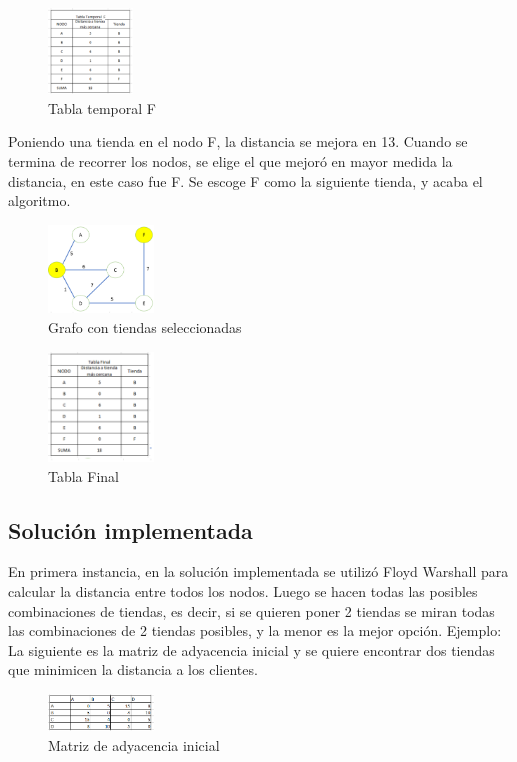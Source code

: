 \documentclass[conference,compsoc]{IEEEtran}
\begin{document}
\begin{figure}[h]
    \centering
    \includegraphics[width=0.20\textwidth]{Problema1/p14.png}
    \caption{Tabla temporal F}
    \label{fig:mesh1}
\end{figure}
$$$$
Poniendo una tienda en el nodo F, la distancia se mejora en 13.
Cuando se termina de recorrer los nodos, se elige el que mejoró en mayor medida la distancia, en este caso fue F.
Se escoge F como la siguiente tienda, y acaba el algoritmo.

\begin{figure}[h]
    \centering
    \includegraphics[width=0.25\textwidth]{Problema1/p15.png}
    \caption{Grafo con tiendas seleccionadas}
    \label{fig:mesh1}
\end{figure}
\begin{figure}[h]
    \centering
    \includegraphics[width=0.25\textwidth]{Problema1/p16.png}
    \caption{Tabla Final}
    \label{fig:mesh1}
\end{figure}

\subsection{Solución implementada}
En primera instancia, en la solución implementada se utilizó Floyd Warshall para calcular la distancia entre todos los nodos. Luego se hacen todas las posibles combinaciones de tiendas, es decir, si se quieren poner 2 tiendas se miran todas las combinaciones de 2 tiendas posibles, y la menor es la mejor opción. 
Ejemplo:
La siguiente es la matriz de adyacencia inicial y se quiere encontrar dos tiendas que minimicen la distancia a los clientes.
\begin{figure}[h]
    \centering
    \includegraphics[width=0.25\textwidth]{Problema1/p17.png}
    \caption{Matriz de adyacencia inicial}
    \label{fig:mesh1}
\end{figure}
\end{document}

